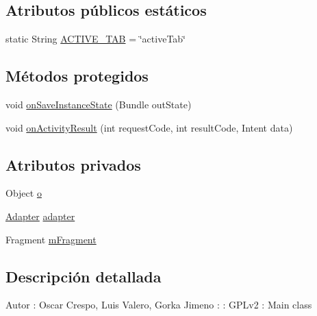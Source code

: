 \subsection*{Atributos públicos estáticos}
\begin{DoxyCompactItemize}
\item 
static String \hyperlink{classes_1_1ucm_1_1tfg_1_1controlremotolinux_1_1client_1_1controller_1_1ClientActivityTabs_a070c5a04cbd25078ced59c7bbe7456ba}{A\-C\-T\-I\-V\-E\-\_\-\-T\-A\-B} = \char`\"{}active\-Tab\char`\"{}
\end{DoxyCompactItemize}
\subsection*{Métodos protegidos}
\begin{DoxyCompactItemize}
\item 
void \hyperlink{classes_1_1ucm_1_1tfg_1_1controlremotolinux_1_1client_1_1controller_1_1ClientActivityTabs_ade712b1d29c7ae8eae92e174c2cc2409}{on\-Save\-Instance\-State} (Bundle out\-State)
\item 
void \hyperlink{classes_1_1ucm_1_1tfg_1_1controlremotolinux_1_1client_1_1controller_1_1ClientActivityTabs_aaf3c5b00a7c2755fe7a1b2675f500de1}{on\-Activity\-Result} (int request\-Code, int result\-Code, Intent data)
\end{DoxyCompactItemize}
\subsection*{Atributos privados}
\begin{DoxyCompactItemize}
\item 
Object \hyperlink{classes_1_1ucm_1_1tfg_1_1controlremotolinux_1_1client_1_1controller_1_1ClientActivityTabs_a5d1c55ad6ecc5b6118cfc45e089ade9e}{o}
\item 
\hyperlink{classes_1_1ucm_1_1tfg_1_1controlremotolinux_1_1client_1_1view_1_1Adapter}{Adapter} \hyperlink{classes_1_1ucm_1_1tfg_1_1controlremotolinux_1_1client_1_1controller_1_1ClientActivityTabs_ae89e47227f81294e72d3243d462184cd}{adapter}
\item 
Fragment \hyperlink{classes_1_1ucm_1_1tfg_1_1controlremotolinux_1_1client_1_1controller_1_1ClientActivityTabs_aca2d861e8e41d5dd67c996d00887f2da}{m\-Fragment}
\end{DoxyCompactItemize}


\subsection{Descripción detallada}
\begin{DoxyAuthor}{Autor}
\-: Oscar Crespo, Luis Valero, Gorka Jimeno  \-:  \-: G\-P\-Lv2  \-: Main class 
\end{DoxyAuthor}


